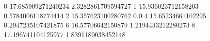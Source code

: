 0 17.685909271240234 2.3282861709594727
1 15.936023712158203 0.5784006118774414
2 15.357623100280762 0.0
4 15.65234661102295 0.2947235107421875
6 16.57706642150879 1.2194433212280273
8 17.196741104125977 1.8391180038452148
